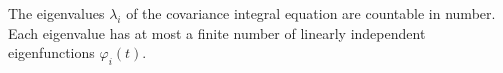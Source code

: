 The eigenvalues $\lambda_i$ of the covariance integral equation are countable in number. Each eigenvalue has at most a finite number of linearly independent eigenfunctions $\varphi_i(t)$.
